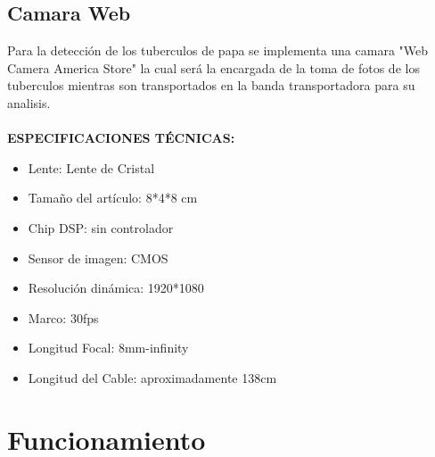 		\subsection{Camara Web}
			Para la detección de los tuberculos de papa se implementa una camara "Web Camera America Store" la cual será la encargada de la toma de fotos de los tuberculos mientras son transportados en la banda transportadora para su analisis.
			\\
			\\
			\textbf{ESPECIFICACIONES TÉCNICAS:}
			\begin{itemize}
				\item Lente: Lente de Cristal
				\item Tamaño del artículo: 8*4*8 cm
				\item Chip DSP: sin controlador
				\item Sensor de imagen: CMOS
				\item Resolución dinámica: 1920*1080
				\item Marco: 30fps
				\item Longitud Focal: 8mm-infinity
				\item Longitud del Cable: aproximadamente 138cm
			\end{itemize}
			
	\section{Funcionamiento}
		













